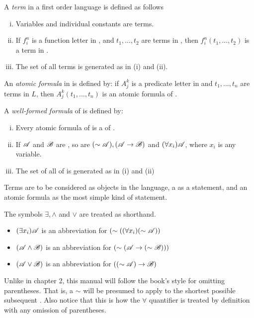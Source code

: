 \setcounter{definition}{5}
\begin{definition}
  A \textit{term} in a first order language \cl{} is defined as follows
  \begin{enumerate}[(i)]
    \item Variables and individual constants are terms.
    \item If \(f^n_i\) is a function letter in \cl{}, and \(t_1, \dots, t_2\) are terms in \cl{}, then \(f^n_i(t_1, \dots, t_2)\) is a term in \cl{}.
    \item The set of all terms is generated as in (i) and (ii).
  \end{enumerate}

  An \textit{atomic formula} in \cl{} is defined by: if \(A^k_j\) is a predicate letter in \cl{} and \(t_1, \dots, t_n\) are terms in \(L\), then \(A^k_j(t_1, \dots, t_n)\) is an atomic formula of \cl{}.

  A \textit{well-formed formula} of \cl{} is defined by:
  \begin{enumerate}[(i)]
    \item Every atomic formula of \cl{} is a \wf{} of \cl{}.
    \item If \(\mathscr{A}\) and \(\mathscr{B}\) are \wfs{}, so are \((\sim\mathscr{A}), (\mathscr{A} \rightarrow \mathscr{B})\) and \((\forall x_i)\mathscr{A}\), where \(x_i\) is any variable.
    \item The set of all \wfs{} of \cl{} is generated as in (i) and (ii)
  \end{enumerate}

  Terms are to be considered as objects in the language, a \wf{} as a statement, and an atomic formula as the most simple kind of statement.
\end{definition}

\medskip

The symbols \(\exists, \land\) and \(\lor\) are treated as shorthand.
\begin{itemize}
  \item \((\exists x_i) \mathscr{A}\) is an abbreviation for \((\sim((\forall x_i)(\sim\mathscr{A}))\)
  \item \((\mathscr{A} \land \mathscr{B})\) is an abbreviation for \((\sim(\mathscr{A} \rightarrow (\sim\mathscr{B})))\)
  \item \((\mathscr{A} \lor \mathscr{B})\) is an abbreviation for \(((\sim\mathscr{A}) \rightarrow \mathscr{B})\)
\end{itemize}

\note{} Unlike in chapter 2, this manual will follow the book's style for omitting parentheses. That is, a \(\sim\) will be presumed to apply to the shortest possible subsequent \wf{}. Also notice that this is how the \(\forall\) quantifier is treated by definition with any omission of parentheses.

